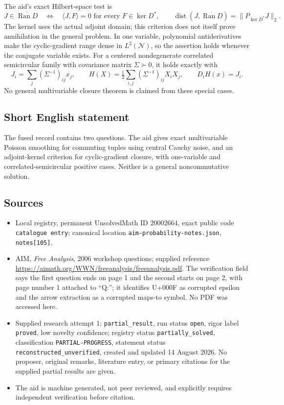 \documentclass[11pt]{article}
\begin{document}
The aid's exact Hilbert-space test is
\[
 J\in\overline{\operatorname{Ran}D}
 \quad\Longleftrightarrow\quad
 \langle J,F\rangle=0\text{ for every }F\in\ker D^*,
 \qquad
 \operatorname{dist}(J,\overline{\operatorname{Ran}D})
 =\|P_{\ker D^*}J\|_2.
\]
The kernel uses the actual adjoint domain; this criterion does not itself prove annihilation in the general problem. In one variable, polynomial antiderivatives make the cyclic-gradient range dense in \(L^2(\mathcal N)\), so the assertion holds whenever the conjugate variable exists. For a centered nondegenerate correlated semicircular family with covariance matrix \(\Sigma\succ0\), it holds exactly with
\[
 J_i=\sum_j(\Sigma^{-1})_{ij}x_j,\qquad
 H(X)=\tfrac12\sum_{i,j}(\Sigma^{-1})_{ij}X_iX_j,
 \qquad D_iH(x)=J_i.
\]
No general multivariable closure theorem is claimed from these special cases.
\subsection{Short English statement}
The fused record contains two questions. The aid gives exact multivariable Poisson smoothing for commuting tuples using central Cauchy noise, and an adjoint-kernel criterion for cyclic-gradient closure, with one-variable and correlated-semicircular positive cases. Neither is a general noncommutative solution.
\subsection{Sources}
\begin{itemize}
\item Local registry, permanent UnsolvedMath ID \(20002664\), exact public code \texttt{catalogue entry}; canonical location \texttt{aim-probability-notes.json}, \texttt{notes[105]}.
\item AIM, \emph{Free Analysis}, 2006 workshop questions; supplied reference \url{https://aimath.org/WWN/freeanalysis/freeanalysis.pdf}. The verification field says the first question ends on page 1 and the second starts on page 2, with page number 1 attached to ``Q:''; it identifies U+000F as corrupted epsilon and the arrow extraction as a corrupted maps-to symbol. No PDF was accessed here.
\item Supplied research attempt 1: \texttt{partial\_result}, run status \texttt{open}, rigor label \texttt{proved}, low novelty confidence; registry status \texttt{partially\_solved}, classification \texttt{PARTIAL-PROGRESS}, statement status \texttt{reconstructed\_unverified}, created and updated 14 August 2026. No proposer, original remarks, literature entry, or primary citations for the supplied partial results are given.
\item The aid is machine generated, not peer reviewed, and explicitly requires independent verification before citation.
\end{itemize}
\end{document}
